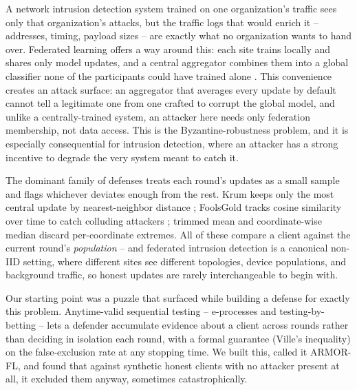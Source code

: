 \documentclass[pdflatex,iicol,sn-mathphys-num]{sn-jnl}%
\theoremstyle{thmstyleone}%
\theoremstyle{thmstyletwo}%
\theoremstyle{thmstylethree}%
\begin{document}
A network intrusion detection system trained on one organization's traffic sees only that organization's attacks, but the traffic logs that would enrich it -- addresses, timing, payload sizes -- are exactly what no organization wants to hand over. Federated learning offers a way around this: each site trains locally and shares only model updates, and a central aggregator combines them into a global classifier none of the participants could have trained alone \citep{mcmahan2017fedavg}. This convenience creates an attack surface: an aggregator that averages every update by default cannot tell a legitimate one from one crafted to corrupt the global model, and unlike a centrally-trained system, an attacker here needs only federation membership, not data access. This is the Byzantine-robustness problem, and it is especially consequential for intrusion detection, where an attacker has a strong incentive to degrade the very system meant to catch it.

The dominant family of defenses treats each round's updates as a small sample and flags whichever deviates enough from the rest. Krum keeps only the most central update by nearest-neighbor distance \citep{blanchard2017krum}; FoolsGold tracks cosine similarity over time to catch colluding attackers \citep{fung2020foolsgold}; trimmed mean and coordinate-wise median discard per-coordinate extremes. All of these compare a client against the current round's \emph{population} -- and federated intrusion detection is a canonical non-IID setting, where different sites see different topologies, device populations, and background traffic, so honest updates are rarely interchangeable to begin with.

Our starting point was a puzzle that surfaced while building a defense for exactly this problem. Anytime-valid sequential testing -- e-processes and testing-by-betting \citep{waudbysmith2020betting} -- lets a defender accumulate evidence about a client across rounds rather than deciding in isolation each round, with a formal guarantee (Ville's inequality) on the false-exclusion rate at any stopping time. We built this, called it ARMOR-FL, and found that against synthetic honest clients with no attacker present at all, it excluded them anyway, sometimes catastrophically.
\end{document}
